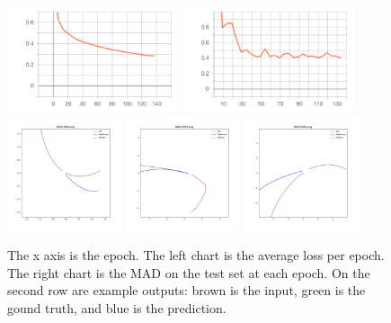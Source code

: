 \documentclass{article}
\begin{document}
\begin{figure}
    \centering
    \includegraphics[width=0.45\textwidth]{loss_train_baseline_long.pdf}
     \includegraphics[width=0.45\textwidth]{test_mad_train_baseline_long}\\
    \includegraphics[width=0.3\textwidth]{baseline0}
    \includegraphics[width=0.3\textwidth]{baseline1}
    \includegraphics[width=0.3\textwidth]{baseline2}\\
    \caption{The x axis is the epoch. The left chart is the average loss per epoch. The right chart is the MAD on the test set at each epoch. On the second row are example outputs: brown is the input, green is the gound truth, and blue is the prediction.}
    \label{baseline_train_loss}
\end{figure}
\end{document}
